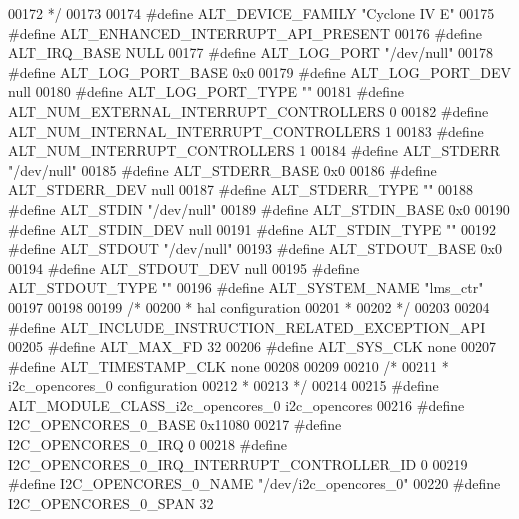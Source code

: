 \begin{DoxyCode}
00172 \textcolor{comment}{ */}
00173 
00174 \textcolor{preprocessor}{#define ALT\_DEVICE\_FAMILY "Cyclone IV E"}
00175 \textcolor{preprocessor}{#define ALT\_ENHANCED\_INTERRUPT\_API\_PRESENT}
00176 \textcolor{preprocessor}{#define ALT\_IRQ\_BASE NULL}
00177 \textcolor{preprocessor}{#define ALT\_LOG\_PORT "/dev/null"}
00178 \textcolor{preprocessor}{#define ALT\_LOG\_PORT\_BASE 0x0}
00179 \textcolor{preprocessor}{#define ALT\_LOG\_PORT\_DEV null}
00180 \textcolor{preprocessor}{#define ALT\_LOG\_PORT\_TYPE ""}
00181 \textcolor{preprocessor}{#define ALT\_NUM\_EXTERNAL\_INTERRUPT\_CONTROLLERS 0}
00182 \textcolor{preprocessor}{#define ALT\_NUM\_INTERNAL\_INTERRUPT\_CONTROLLERS 1}
00183 \textcolor{preprocessor}{#define ALT\_NUM\_INTERRUPT\_CONTROLLERS 1}
00184 \textcolor{preprocessor}{#define ALT\_STDERR "/dev/null"}
00185 \textcolor{preprocessor}{#define ALT\_STDERR\_BASE 0x0}
00186 \textcolor{preprocessor}{#define ALT\_STDERR\_DEV null}
00187 \textcolor{preprocessor}{#define ALT\_STDERR\_TYPE ""}
00188 \textcolor{preprocessor}{#define ALT\_STDIN "/dev/null"}
00189 \textcolor{preprocessor}{#define ALT\_STDIN\_BASE 0x0}
00190 \textcolor{preprocessor}{#define ALT\_STDIN\_DEV null}
00191 \textcolor{preprocessor}{#define ALT\_STDIN\_TYPE ""}
00192 \textcolor{preprocessor}{#define ALT\_STDOUT "/dev/null"}
00193 \textcolor{preprocessor}{#define ALT\_STDOUT\_BASE 0x0}
00194 \textcolor{preprocessor}{#define ALT\_STDOUT\_DEV null}
00195 \textcolor{preprocessor}{#define ALT\_STDOUT\_TYPE ""}
00196 \textcolor{preprocessor}{#define ALT\_SYSTEM\_NAME "lms\_ctr"}
00197 
00198 
00199 \textcolor{comment}{/*}
00200 \textcolor{comment}{ * hal configuration}
00201 \textcolor{comment}{ *}
00202 \textcolor{comment}{ */}
00203 
00204 \textcolor{preprocessor}{#define ALT\_INCLUDE\_INSTRUCTION\_RELATED\_EXCEPTION\_API}
00205 \textcolor{preprocessor}{#define ALT\_MAX\_FD 32}
00206 \textcolor{preprocessor}{#define ALT\_SYS\_CLK none}
00207 \textcolor{preprocessor}{#define ALT\_TIMESTAMP\_CLK none}
00208 
00209 
00210 \textcolor{comment}{/*}
00211 \textcolor{comment}{ * i2c\_opencores\_0 configuration}
00212 \textcolor{comment}{ *}
00213 \textcolor{comment}{ */}
00214 
00215 \textcolor{preprocessor}{#define ALT\_MODULE\_CLASS\_i2c\_opencores\_0 i2c\_opencores}
00216 \textcolor{preprocessor}{#define I2C\_OPENCORES\_0\_BASE 0x11080}
00217 \textcolor{preprocessor}{#define I2C\_OPENCORES\_0\_IRQ 0}
00218 \textcolor{preprocessor}{#define I2C\_OPENCORES\_0\_IRQ\_INTERRUPT\_CONTROLLER\_ID 0}
00219 \textcolor{preprocessor}{#define I2C\_OPENCORES\_0\_NAME "/dev/i2c\_opencores\_0"}
00220 \textcolor{preprocessor}{#define I2C\_OPENCORES\_0\_SPAN 32}

\end{DoxyCode}
